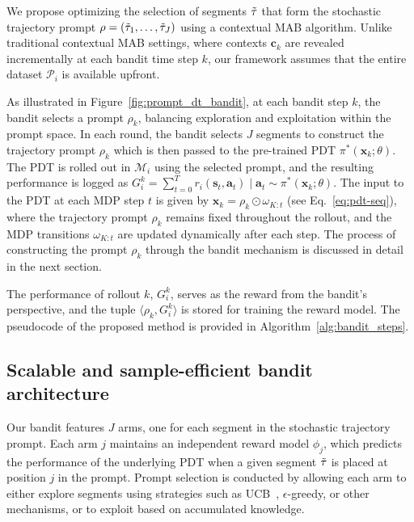 \documentclass{article} %
\begin{document}
We propose optimizing the selection of segments $\Tilde{\tau}$ that form the stochastic trajectory prompt $\rho = (\Tilde{\tau}_1, \dots, \Tilde{\tau}_J)$ using a contextual MAB algorithm. Unlike traditional contextual MAB settings, where contexts $\mathbf{c}_k$ are revealed incrementally at each bandit time step $k$, our framework assumes that the entire dataset $\mathcal{P}_i$ is available upfront.

As illustrated in Figure~\ref{fig:prompt_dt_bandit}, at each bandit step $k$, the bandit selects a prompt $\rho_k$, balancing exploration and exploitation within the prompt space. In each round, the bandit selects $J$ segments to construct the trajectory prompt $\rho_k$ which is then passed to the pre-trained PDT $\pi^*(\mathbf{x}_k; \theta)$. The PDT is rolled out in $\mathcal{M}_i$ using the selected prompt, and the resulting performance is logged as $G_i^k = \sum_{t=0}^T r_i(\mathbf{s}_t, \mathbf{a}_t) \mid \mathbf{a}_t \sim \pi^*(\mathbf{x}_k; \theta)$. The input to the PDT at each MDP step $t$ is given by $\mathbf{x}_k = \rho_k \odot \omega_{K:t}$ (see Eq.~\ref{eq:pdt-seq}), where the trajectory prompt $\rho_k$ remains fixed throughout the rollout, and the MDP transitions $\omega_{K:t}$ are updated dynamically after each step. The process of constructing the prompt $\rho_k$ through the bandit mechanism is discussed in detail in the next section.

The performance of rollout $k$, $G_i^k$, serves as the reward from the bandit's perspective, and the tuple $\langle \rho_k, G_i^k \rangle$ is stored for training the reward model. The pseudocode of the proposed method is provided in Algorithm~\ref{alg:bandit_steps}.

\subsection{Scalable and sample-efficient bandit architecture}
Our bandit features $J$ arms, one for each segment in the stochastic trajectory prompt. Each arm $j$ maintains an independent reward model $\phi_j$, which predicts the performance of the underlying PDT when a given segment $\Tilde{\tau}$ is placed at position $j$ in the prompt. Prompt selection is conducted by allowing each arm to either explore segments using strategies such as UCB~\citep{li2010contextual}, $\epsilon$-greedy, or other mechanisms, or to exploit based on accumulated knowledge.
\end{document}
